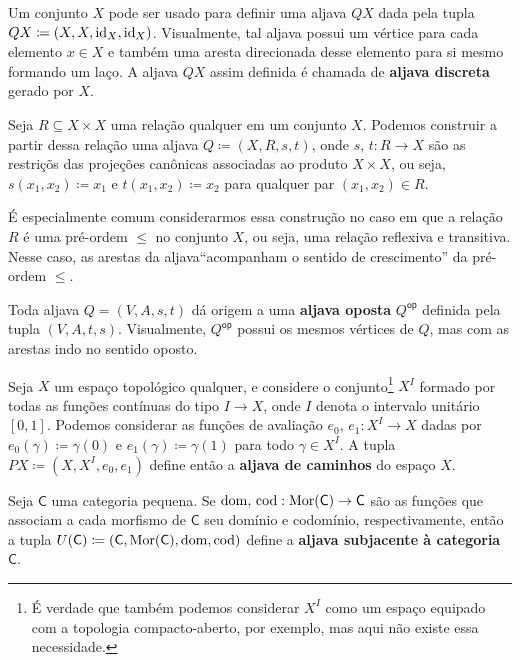 \begin{exem}\label{exem:aljava_discreta}
    Um conjunto $X$ pode ser usado para definir uma aljava $QX$ dada pela tupla $QX \coloneqq (X,X,\mathrm{id}_X,\mathrm{id}_X)$.
    Visualmente, tal aljava possui um vértice para cada elemento $x \in X$ e também uma aresta direcionada desse elemento para si mesmo formando um laço.
    A aljava $QX$ assim definida é chamada de \textbf{aljava discreta} gerado por $X$.
\end{exem}

\begin{exem}\label{exem:aljava_via_relacao}
    Seja $R \subseteq X \times X$ uma relação qualquer em um conjunto $X$.
    Podemos construir a partir dessa relação uma aljava $Q \coloneqq (X,R,s,t)$, onde $s,\,t: R \to X$ são as restriçõs das projeções canônicas associadas ao produto $X \times X$, ou seja, $s(x_1,x_2) \coloneqq x_1$ e $t(x_1,x_2) \coloneqq x_2$ para qualquer par $(x_1,x_2) \in R$.
    
    É especialmente comum considerarmos essa construção no caso em que a relação $R$ é uma pré-ordem $\leq$ no conjunto $X$, ou seja, uma relação reflexiva e transitiva.
    Nesse caso, as arestas da aljava``acompanham o sentido de crescimento'' da pré-ordem $\leq$.
\end{exem}

\begin{exem}\label{exem:aljava_oposta}
    Toda aljava $Q=(V,A,s,t)$ dá origem a uma \textbf{aljava oposta} $Q^{\mathsf{op}}$ definida pela tupla $(V,A,t,s)$.
    Visualmente, $Q^{\mathsf{op}}$ possui os mesmos vértices de $Q$, mas com as arestas indo no sentido oposto.
\end{exem}

\begin{exem}\label{exem:aljava_via_espaco}
    Seja $X$ um espaço topológico qualquer, e considere o conjunto\footnote{É verdade que também podemos considerar $X^I$ como um espaço equipado com a topologia compacto-aberto, por exemplo, mas aqui não existe essa necessidade.} $X^I$ formado por todas as funções contínuas do tipo $I \to X$, onde $I$ denota o intervalo unitário $[0,1]$.
    Podemos considerar as funções de avaliação $e_0,\, e_1: X^I \to X$ dadas por $e_0(\gamma) \coloneqq \gamma(0)$ e $e_1(\gamma) \coloneqq \gamma(1)$ para todo $\gamma \in X^{I}$.
    A tupla $PX \coloneqq (X,X^I,e_0,e_1)$ define então a \textbf{aljava de caminhos} do espaço $X$.
\end{exem}

\begin{exem}\label{exem:aljava_subjacente_categoria}
    Seja $\mathsf{C}$ uma categoria pequena.
    Se $\mathrm{dom},\,\mathrm{cod}: \mathrm{Mor}(\mathsf{C}) \to \mathsf{C}$ são as funções que associam a cada morfismo de $\mathsf{C}$ seu domínio e codomínio, respectivamente, então a tupla $U(\mathsf{C}) \coloneqq (\mathsf{C},\mathrm{Mor}(\mathsf{C}),\mathrm{dom},\mathrm{cod})$ define a \textbf{aljava subjacente à categoria} $\mathsf{C}$.
\end{exem}

